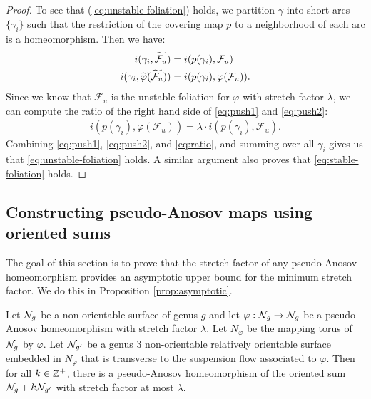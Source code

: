 \begin{proof}
  To see that (\ref{eq:unstable-foliation}) holds, we partition $\gamma$ into short arcs $\{\gamma_i\}$ such that the restriction of the covering map $p$ to a neighborhood of each arc is a homeomorphism.
  Then we have:
  \begin{align}
  \label{eq:push1}
    i(\gamma_i, \widetilde{\mathcal{F}_u}) &= i(p(\gamma_i), \mathcal{F}_u) \\
  \label{eq:push2}
    i(\gamma_i, \widetilde{\varphi}(\widetilde{\mathcal{F}_u})) &= i(p(\gamma_i), \varphi(\mathcal{F}_u)).
  \end{align}
  Since we know that $\mathcal{F}_u$ is the unstable foliation for $\varphi$ with stretch factor $\lambda$, we can compute the ratio of the right hand side of \eqref{eq:push1} and \eqref{eq:push2}:
  \begin{align}
      \label{eq:ratio}
      i(p(\gamma_i), \varphi(\mathcal{F}_u)) = \lambda \cdot i(p(\gamma_i), \mathcal{F}_u).
  \end{align}
  Combining \eqref{eq:push1}, \eqref{eq:push2}, and \eqref{eq:ratio}, and summing over all $\gamma_i$ gives us that \eqref{eq:unstable-foliation} holds. A similar argument also proves that \eqref{eq:stable-foliation} holds.
\end{proof}



\subsection{Constructing pseudo-Anosov maps using oriented sums}
\label{sec:constr-psuedo-anos}
The goal of this section is to prove that the stretch factor of any pseudo-Anosov homeomorphism provides an asymptotic upper bound for the minimum stretch factor.  We do this in Proposition \ref{prop:asymptotic}.


\begin{prop}\label{prop:asymptotic}
Let $\mathcal{N}_g$ be a non-orientable surface of genus $g$ and let $\varphi:\mathcal{N}_g\rightarrow \mathcal{N}_g$ be a pseudo-Anosov homeomorphism with stretch factor $\lambda$.  Let $N_\varphi$ be the mapping torus of $\mathcal{N}_g$ by $\varphi$.  Let $\mathcal{N}_{g'}$ be a genus $3$ non-orientable relatively orientable surface embedded in $N_\varphi$ that is transverse to the suspension flow associated to $\varphi$.  Then for all $k\in\mathbb{Z}^+$, there is a pseudo-Anosov homeomorphism of the oriented sum $\mathcal{N}_{g}+k\mathcal{N}_{g'}$ with stretch factor at most $\lambda$.
\end{prop}

